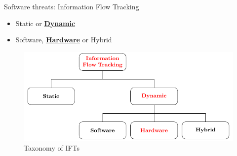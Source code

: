 \begin{frame}{Software threats: Information Flow Tracking}
    \begin{minipage}[c]{0.4\textwidth}
        \begin{block}{}
            \begin{itemize}
                [square]
                \justifying
                \item Static or \underline{\textbf{Dynamic}}
                \item Software, \underline{\textbf{Hardware}} or Hybrid
            \end{itemize}
        \end{block}
    \end{minipage}\hfill%
    \begin{minipage}[c]{0.55\textwidth}
        \begin{figure}
            \centering
            \includegraphics[width=\textwidth]{src/1_introduction/img/arborescence_ift.pdf}
            \caption{Taxonomy of IFTs}
            \label{fig:taxoDIFT}
        \end{figure}
    \end{minipage}
\end{frame}

